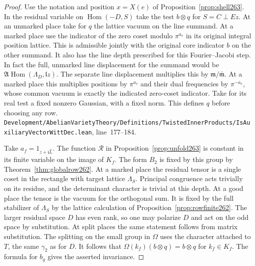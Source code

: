 \documentclass[a4paper,11pt]{article}
\theoremstyle{definition}
\theoremstyle{remark}
\newcommand{\srcloc}[2]{{\small\nolinkurl{#1.lean}}, line~#2}
\numberwithin{equation}{section}
\begin{document}
\begin{proof}
Use the notation and position \(x=X(e)\) of
Proposition~\ref{prop:shell263}. In the residual variable on
\(\operatorname{Hom}(-D,S)\) take the test \(b\otimes q\)
for \(S=C\perp Ez\). At an unmarked place take for \(q\) the
lattice vacuum on the line summand. At a marked place use the
indicator of the zero coset modulo \(\pi^{a_v}\) in its
original integral position lattice. This is admissible jointly
with the original core indicator \(b\) on the other summand.
It also has the line depth prescribed for this Fourier--Jacobi
step. In fact the full, unmarked line displacement for the
summand would be
\(\mathfrak A\operatorname{Hom}(\Lambda_D,\mathfrak l z)\).
The separate line displacement multiplies this by
\(\mathfrak m/\bar{\mathfrak m}\). At a marked place this
multiplies positions by \(\pi^{a_v}\) and their dual
frequencies by \(\pi^{-a_v}\), whose common vacuum is exactly
the indicated zero-coset indicator. Take for its real test
a fixed nonzero Gaussian, with a fixed norm. This defines
\(q\) before choosing any row.
\srcloc{Development/AbelianVarietyTheory/Definitions/TwistedInnerProducts/IsAuxiliaryVectorWittDec}{177--184}.

Take \(a_f=1_{z+\mathfrak j\widehat L}\). The function
\(\mathcal R\) in Proposition~\ref{prop:unfold263} is constant
in its finite variable on the image of \(K_f\). The form \(B_2\)
is fixed by this group by Theorem~\ref{thm:globalrow262}.
At a marked place the residual tensor is a single coset in
the rectangle with target lattice \(\Lambda_S\). Principal
congruence acts trivially on its residue, and the determinant
character is trivial at this depth. At a good place the tensor
is the vacuum for the orthogonal sum. It is fixed by the full
stabilizer of \(\Lambda_S\) by the lattice calculation of
Proposition~\ref{prop:rowfinite262}. The larger residual space
\(D\) has even rank, so one may polarize \(D\) and act on
the odd space by substitution. At split places the same
statement follows from matrix substitution. The splitting on
the small group in \(\Omega\) uses the character attached to
\(T\), the same \(\gamma_2\) as for \(D\). It follows that
\(\Omega(k_f)(b\otimes q)=b\otimes q\) for \(k_f\in K_f\).
The formula for \(b_g\) gives the asserted invariance.


\end{proof}
\end{document}
